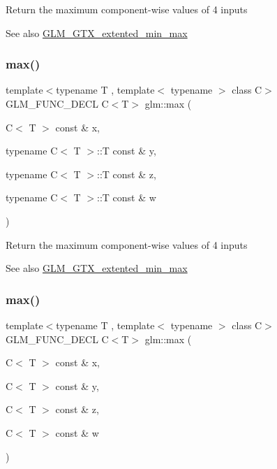 Return the maximum component-\/wise values of 4 inputs \begin{DoxySeeAlso}{See also}
\hyperlink{group__gtx__extented__min__max}{G\+L\+M\+\_\+\+G\+T\+X\+\_\+extented\+\_\+min\+\_\+max} 
\end{DoxySeeAlso}
\mbox{\label{group__gtx__extented__min__max_ga7cca8b53cfda402040494cdf40fbdf4a}} 
\subsubsection{\texorpdfstring{max()}{max()}\hspace{0.1cm}{\footnotesize\ttfamily [5/6]}}
{\footnotesize\ttfamily template$<$typename T , template$<$ typename $>$ class C$>$ \\
G\+L\+M\+\_\+\+F\+U\+N\+C\+\_\+\+D\+E\+CL C$<$T$>$ glm\+::max (\begin{DoxyParamCaption}\item[{C$<$ T $>$ const \&}]{x,  }\item[{typename C$<$ T $>$\+::T const \&}]{y,  }\item[{typename C$<$ T $>$\+::T const \&}]{z,  }\item[{typename C$<$ T $>$\+::T const \&}]{w }\end{DoxyParamCaption})}

Return the maximum component-\/wise values of 4 inputs \begin{DoxySeeAlso}{See also}
\hyperlink{group__gtx__extented__min__max}{G\+L\+M\+\_\+\+G\+T\+X\+\_\+extented\+\_\+min\+\_\+max} 
\end{DoxySeeAlso}
\mbox{\label{group__gtx__extented__min__max_gaacffbc466c2d08c140b181e7fd8a4858}} 
\subsubsection{\texorpdfstring{max()}{max()}\hspace{0.1cm}{\footnotesize\ttfamily [6/6]}}
{\footnotesize\ttfamily template$<$typename T , template$<$ typename $>$ class C$>$ \\
G\+L\+M\+\_\+\+F\+U\+N\+C\+\_\+\+D\+E\+CL C$<$T$>$ glm\+::max (\begin{DoxyParamCaption}\item[{C$<$ T $>$ const \&}]{x,  }\item[{C$<$ T $>$ const \&}]{y,  }\item[{C$<$ T $>$ const \&}]{z,  }\item[{C$<$ T $>$ const \&}]{w }\end{DoxyParamCaption})}

